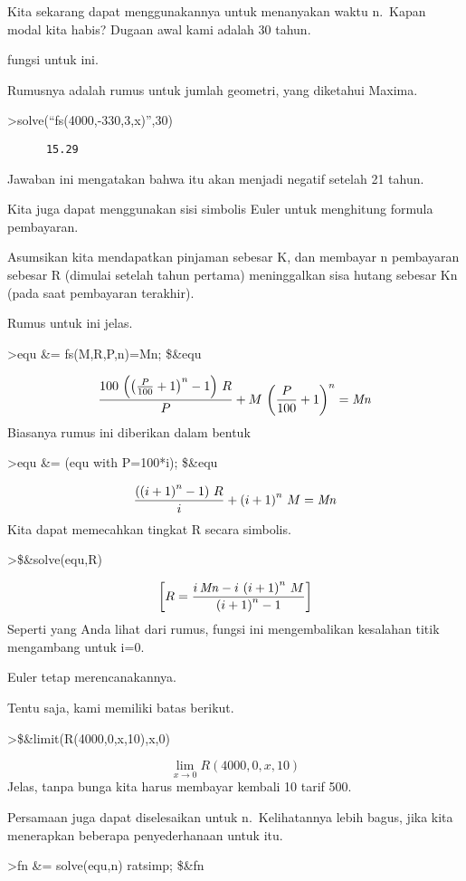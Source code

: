 \documentclass[
]{book}
\begin{document}
Kita sekarang dapat menggunakannya untuk menanyakan waktu n.~Kapan modal kita habis? Dugaan awal kami adalah 30 tahun.

fungsi untuk ini.

Rumusnya adalah rumus untuk jumlah geometri, yang diketahui Maxima.

\textgreater solve(``fs(4000,-330,3,x)'',30)

\begin{verbatim}
      15.29 
\end{verbatim}

Jawaban ini mengatakan bahwa itu akan menjadi negatif setelah 21 tahun.

Kita juga dapat menggunakan sisi simbolis Euler untuk menghitung formula pembayaran.

Asumsikan kita mendapatkan pinjaman sebesar K, dan membayar n pembayaran sebesar R (dimulai setelah tahun pertama) meninggalkan sisa hutang sebesar Kn (pada saat pembayaran terakhir).

Rumus untuk ini jelas.

\textgreater equ \&= fs(M,R,P,n)=Mn; \$\&equ

\[\frac{100\,\left(\left(\frac{P}{100}+1\right)^{n}-1\right)\,R}{P}+M
 \,\left(\frac{P}{100}+1\right)^{n}={\it Mn}\]Biasanya rumus ini diberikan dalam bentuk

\textgreater equ \&= (equ with P=100*i); \$\&equ

\[\frac{\left(\left(i+1\right)^{n}-1\right)\,R}{i}+\left(i+1\right)^{
 n}\,M={\it Mn}\]Kita dapat memecahkan tingkat R secara simbolis.

\textgreater\$\&solve(equ,R)

\[\left[ R=\frac{i\,{\it Mn}-i\,\left(i+1\right)^{n}\,M}{\left(i+1
 \right)^{n}-1} \right] \]Seperti yang Anda lihat dari rumus, fungsi ini mengembalikan kesalahan titik mengambang untuk i=0.

Euler tetap merencanakannya.

Tentu saja, kami memiliki batas berikut.

\textgreater\$\&limit(R(4000,0,x,10),x,0)

\[\lim_{x\rightarrow 0}{R\left(4000 , 0 , x , 10\right)}\]Jelas, tanpa bunga kita harus membayar kembali 10 tarif 500.

Persamaan juga dapat diselesaikan untuk n.~Kelihatannya lebih bagus, jika kita menerapkan beberapa penyederhanaan untuk itu.

\textgreater fn \&= solve(equ,n) \textbar{} ratsimp; \$\&fn
\end{document}

